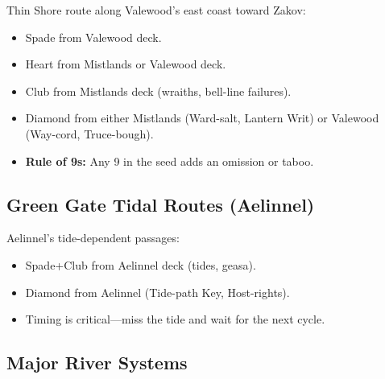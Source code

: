 Thin Shore route along Valewood's east coast toward Zakov:
\begin{itemize}
\item Spade from Valewood deck.
\item Heart from Mistlands or Valewood deck.
\item Club from Mistlands deck (wraiths, bell-line failures).
\item Diamond from either Mistlands (Ward-salt, Lantern Writ) or Valewood (Way-cord, Truce-bough).
\item \textbf{Rule of 9s:} Any 9 in the seed adds an omission or taboo.
\end{itemize}

\subsection{Green Gate Tidal Routes (Aelinnel)}
\label{subsec:green-gate}

Aelinnel's tide-dependent passages:
\begin{itemize}
\item Spade+Club from Aelinnel deck (tides, geasa).
\item Diamond from Aelinnel (Tide-path Key, Host-rights).
\item Timing is critical—miss the tide and wait for the next cycle.
\end{itemize}

\subsection{Major River Systems}
\label{subsec:river-systems}

